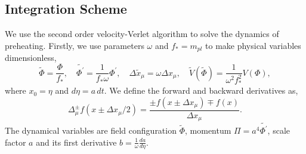 \documentclass[12pt, a4paper]{article}
\begin{document}
\subsection{Integration Scheme}

We use the second order velocity-Verlet algorithm to solve the dynamics of preheating. Firstly, we use
parameters $\omega$ and $f_{*}=m_{pl}$ to make physical variables dimensionless,
\begin{equation}
  \tilde{\Phi}=\frac{\Phi}{f_{*}},\quad \tilde{\Phi^{\prime}}=\frac{1}{f_{*}\omega}\Phi^{\prime},
  \quad \Delta\tilde{x}_{\mu}=\omega \Delta x_{\mu}, \quad \tilde{V}\left(\tilde{\Phi}\right)=\frac{1}{\omega^2f_{*}^2}V\left(\Phi\right),
\end{equation}
where $x_0 =\eta$ and $d\eta=a\, dt$.
We define the forward and backward derivatives as,
\begin{equation}
  \Delta_{\mu}^{\pm}f\left(x\pm\Delta x_{\mu}/2\right)=\frac{\pm f\left(x \pm \Delta x_{\mu}\right)\mp f\left(x\right)}{\Delta x_{\mu}}.
\end{equation}
The dynamical variables are field configuration $\tilde{\Phi}$, momentum $\Pi=a^4\tilde{\Phi^{\prime}}$, scale factor $a$ and its first derivative $b=\frac{1}{\omega}\frac{da}{d\eta}$.
\end{document}
